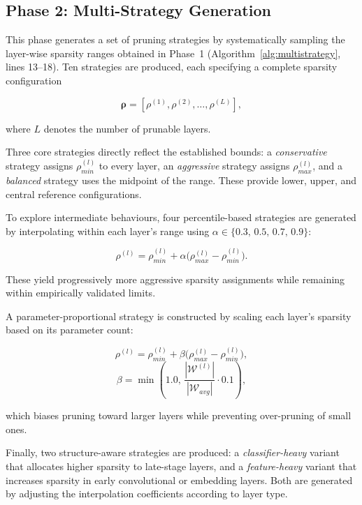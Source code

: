 \documentclass[11pt, conference]{IEEEtran}
\begin{document}
\subsection{Phase 2: Multi-Strategy Generation}

This phase generates a set of pruning strategies by systematically sampling the layer-wise sparsity ranges obtained in Phase~1 (Algorithm~\ref{alg:multistrategy}, lines 13--18). Ten strategies are produced, each specifying a complete sparsity configuration

\begin{equation}
\boldsymbol{\rho} = [\rho^{(1)}, \rho^{(2)}, \ldots, \rho^{(L)}],
\end{equation}

where $L$ denotes the number of prunable layers.

Three core strategies directly reflect the established bounds: a \emph{conservative} strategy assigns $\rho_{min}^{(l)}$ to every layer, an \emph{aggressive} strategy assigns $\rho_{max}^{(l)}$, and a \emph{balanced} strategy uses the midpoint of the range. These provide lower, upper, and central reference configurations.

To explore intermediate behaviours, four percentile-based strategies are generated by interpolating within each layer's range using $\alpha \in \{0.3,\,0.5,\,0.7,\,0.9\}$:

\begin{equation}
\rho^{(l)} = \rho_{min}^{(l)} + \alpha\big(\rho_{max}^{(l)} - \rho_{min}^{(l)}\big).
\end{equation}

These yield progressively more aggressive sparsity assignments while remaining within empirically validated limits.

A parameter-proportional strategy is constructed by scaling each layer's sparsity based on its parameter count:

\begin{equation}
\rho^{(l)} = \rho_{min}^{(l)} + \beta\big(\rho_{max}^{(l)} - \rho_{min}^{(l)}\big),
\end{equation}
\begin{equation}
\beta = \min\left(1.0,\, \frac{|\mathcal{W}^{(l)}|}{|\mathcal{W}_{avg}|} \cdot 0.1\right),
\end{equation}

which biases pruning toward larger layers while preventing over-pruning of small ones.

Finally, two structure-aware strategies are produced: a \emph{classifier-heavy} variant that allocates higher sparsity to late-stage layers, and a \emph{feature-heavy} variant that increases sparsity in early convolutional or embedding layers. Both are generated by adjusting the interpolation coefficients according to layer type.
\end{document}
